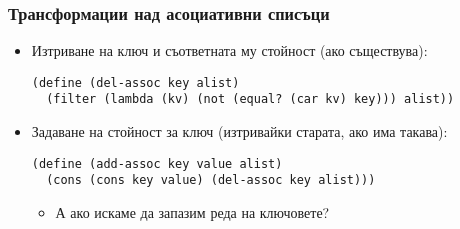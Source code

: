 \documentclass[alsotrans]{beamerswitch}
\begin{document}
\begin{frame}[fragile]
  \frametitle{Трансформации над асоциативни списъци}

  \begin{itemize}[<+->]
  \item Изтриване на ключ и съответната му стойност (ако съществува):\\
    \onslide<+->
\begin{lstlisting}
(define (del-assoc key alist)
  (filter (lambda (kv) (not (equal? (car kv) key))) alist))
\end{lstlisting}
  \item Задаване на стойност за ключ (изтривайки старата, ако има такава):\\
    \onslide<+->
\begin{lstlisting}
(define (add-assoc key value alist)
  (cons (cons key value) (del-assoc key alist)))
\end{lstlisting}
    \begin{itemize}
    \item А ако искаме да запазим реда на ключовете?
    \end{itemize}
  \end{itemize}
\end{frame}
\begin{comment}
\begin{frame}[fragile]
  \frametitle{Задаване на стойност за ключ}
\small
  \textbf{Вариант №1 (грозен и по-бърз):}
\begin{lstlisting}
(define (add-assoc key value alist)
   (let ((new-kv (cons key value)))
        (cond ((null? alist) (list new-kv))
              ((eqv? (caar alist) key) (cons new-kv (cdr alist)))
              (else (cons (car alist)
                    (add-assoc key value (cdr alist))))))
\end{lstlisting}
  \pause
  \textbf{Вариант №2 (красив и по-бавен):}
\begin{lstlisting}
(define (add-assoc key value alist)
  (let ((new-kv (cons key value)))
       (if (assq key alist)
           (map (lambda (kv) (if (eq? (car kv) key)
                                 new-kv kv)) alist)
           (cons new-kv alist))))
\end{lstlisting}
\end{frame}
\end{comment}
\end{document}
